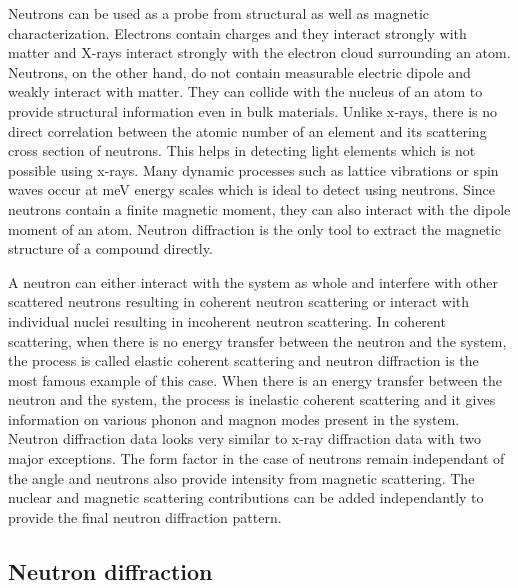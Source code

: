 \documentclass[10pt,doublespacing,edeposit]{uiucthesis2020}
\begin{document}
\begin{mainmatter}
Neutrons can be used as a probe from structural as well as magnetic characterization. Electrons contain charges and they interact strongly with matter and X-rays interact strongly with the electron cloud surrounding an atom. Neutrons, on the other hand, do not contain measurable electric dipole and weakly interact with matter. They can collide with the nucleus of an atom to provide structural information even in bulk materials. Unlike x-rays, there is no direct correlation between the atomic number of an element and its scattering cross section of neutrons. This helps in detecting light elements which is not possible using x-rays. Many dynamic processes such as lattice vibrations or spin waves occur at meV energy scales which is ideal to detect using neutrons. Since neutrons contain a finite magnetic moment, they can also interact with the dipole moment of an atom. Neutron diffraction is the only tool to extract the magnetic structure of a compound directly.

A neutron can either interact with the system as whole and interfere with other scattered neutrons resulting in coherent neutron scattering or interact with individual nuclei resulting in incoherent neutron scattering. In coherent scattering, when there is no energy transfer between the neutron and the system, the process is called elastic coherent scattering and neutron diffraction is the most famous example of this case. When there is an energy transfer between the neutron and the system, the process is inelastic coherent scattering and it gives information on various phonon and magnon modes present in the system. Neutron diffraction data looks very similar to x-ray diffraction data with two major exceptions. The form factor in the case of neutrons remain independant of the angle and neutrons also provide intensity from magnetic scattering. The nuclear and magnetic scattering contributions can be added independantly to provide the final neutron diffraction pattern.

\subsection{Neutron diffraction}



\end{mainmatter}
\end{document}
